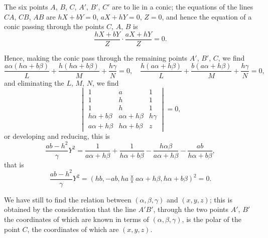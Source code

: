 \documentclass[11pt,a4paper]{article}
\theoremstyle{plain}
\begin{document}
The six points $A$, $B$, $C$, $A'$, $B'$, $C'$ are to lie in a conic; the equations of the lines $CA$, $CB$, $AB$ are $hX + bY = 0$, $aX + hY = 0$, $Z = 0$, and hence the equation of a conic passing through the points $C$, $A$, $B$ is
\begin{equation}
\frac{hX + bY}{Z} \cdot \frac{aX + hY}{Z} = 0.
\end{equation}

\newpage
\setcounter{equation}{17}

Hence, making the conic pass through the remaining points $A'$, $B'$, $C$, we find
\begin{equation}
\frac{a\alpha(h\alpha + b\beta)}{L} + \frac{h(h\alpha + b\beta)}{M} + \frac{h\gamma}{N} = 0, \quad \frac{h(a\alpha + h\beta)}{L} + \frac{b(a\alpha + h\beta)}{M} + \frac{h\gamma}{N} = 0,
\end{equation}
and eliminating the $L$, $M$, $N$, we find
\begin{equation}
\begin{vmatrix}
1 & a & 1 \\
1 & h & 1 \\
1 & h & 1 \\
h\alpha + b\beta & a\alpha + h\beta & h\gamma \\
a\alpha + h\beta & h\alpha + b\beta & z
\end{vmatrix} = 0,
\end{equation}
or developing and reducing, this is
\begin{equation}
\frac{ab-h^2}{\gamma}Y^2 = \frac{1}{a\alpha + h\beta} + \frac{1}{h\alpha + b\beta} - \frac{h\alpha\beta}{a\alpha + h\beta} - \frac{ab}{h\alpha + b\beta},
\end{equation}
that is
\begin{equation}
\frac{ab-h^2}{\gamma}Y^2 = (hb, -ab, ha \between a\alpha + h\beta, h\alpha + b\beta)^2 = 0.
\end{equation}

We have still to find the relation between $(\alpha, \beta, \gamma)$ and $(x, y, z)$; this is obtained by the consideration that the line $A'B'$, through the two points $A'$, $B'$ the coordinates of which are known in terms of $(\alpha, \beta, \gamma)$, is the polar of the point $C$, the coordinates of which are $(x, y, z)$.
\end{document}
